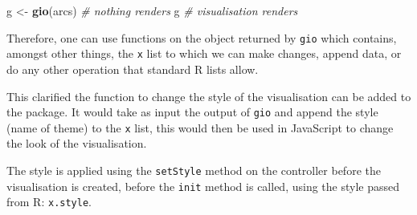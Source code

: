 \documentclass[
]{krantz}
\makeatletter
\newenvironment{Shaded}{\begin{snugshade}}{\end{snugshade}}
\newcommand{\CommentTok}[1]{\textcolor[rgb]{0.37,0.37,0.37}{\textit{#1}}}
\newcommand{\ControlFlowTok}[1]{\textcolor[rgb]{0.27,0.27,0.27}{\textbf{#1}}}
\newcommand{\DataTypeTok}[1]{\textcolor[rgb]{0.27,0.27,0.27}{#1}}
\newcommand{\KeywordTok}[1]{\textcolor[rgb]{0.27,0.27,0.27}{\textbf{#1}}}
\newcommand{\NormalTok}[1]{#1}
\newcommand{\OperatorTok}[1]{\textcolor[rgb]{0.43,0.43,0.43}{\textbf{#1}}}
\newcommand{\StringTok}[1]{\textcolor[rgb]{0.5,0.5,0.5}{#1}}
\newenvironment{kframe}{%
\medskip{}
\setlength{\fboxsep}{.8em}
 \def\at@end@of@kframe{}%
 \ifinner\ifhmode%
  \def\at@end@of@kframe{\end{minipage}}%
  \begin{minipage}{\columnwidth}%
 \fi\fi%
 \def\FrameCommand##1{\hskip\@totalleftmargin \hskip-\fboxsep
 \colorbox{shadecolor}{##1}\hskip-\fboxsep
     \hskip-\linewidth \hskip-\@totalleftmargin \hskip\columnwidth}%
 \MakeFramed {\advance\hsize-\width
   \@totalleftmargin\z@ \linewidth\hsize
   \@setminipage}}%
 {\par\unskip\endMakeFramed%
 \at@end@of@kframe}
\renewenvironment{Shaded}{\begin{kframe}}{\end{kframe}}
\makeatother
\begin{document}
\begin{Shaded}
\begin{Highlighting}[]
\NormalTok{g \textless{}{-}}\StringTok{ }\KeywordTok{gio}\NormalTok{(arcs) }\CommentTok{\# nothing renders}
\NormalTok{g }\CommentTok{\# visualisation renders}
\end{Highlighting}
\end{Shaded}

Therefore, one can use functions on the object returned by \texttt{gio} which contains, amongst other things, the \texttt{x} list to which we can make changes, append data, or do any other operation that standard R lists allow.

\begin{Shaded}
\end{Shaded}

This clarified the function to change the style of the visualisation can be added to the package. It would take as input the output of \texttt{gio} and append the style (name of theme) to the \texttt{x} list, this would then be used in JavaScript to change the look of the visualisation.

\begin{Shaded}
\end{Shaded}

The style is applied using the \texttt{setStyle} method on the controller before the visualisation is created, before the \texttt{init} method is called, using the style passed from R: \texttt{x.style}.
\end{document}
